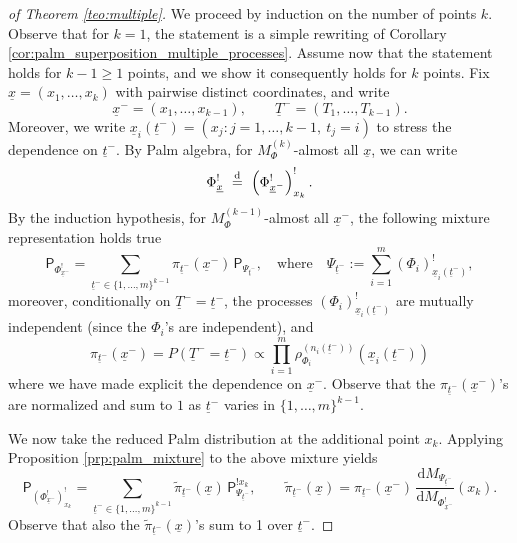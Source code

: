 \documentclass[11pt,a4paper,oneside]{article}
\newcommand{\deq}{\stackrel{\mbox{\scriptsize d}}{=}}
\newcommand{\dd}{\mathrm d}
\newcommand{\plaw}{\mathsf{P}}
\theoremstyle{definition}
\theoremstyle{remark}
\begin{document}
\begin{proof}[of Theorem \ref{teo:multiple}]
We proceed by induction on the number of points $k$. Observe that for $k=1$, the statement is a simple rewriting of Corollary \ref{cor:palm_superposition_multiple_processes}.
Assume now that the statement holds for $k-1\geq 1$ points, and we show it consequently holds for $k$ points. Fix $\underline{x}=(x_1,\ldots,x_k)$ with pairwise distinct coordinates, and write
\[
\underline{x}^-=(x_1,\ldots,x_{k-1}),\qquad \underline{T}^-=(T_1,\ldots,T_{k-1}).
\]
Moreover, we write $\underline{x}_i(\underline{t}^-) = (x_j\colon j=1, \ldots, k-1, \ t_j = i)$ to stress the dependence on $\underline{t}^-$.
By Palm algebra, for $M_\Phi^{(k)}$-almost all $\underline{x}$, we can write
\begin{equation}
\label{eq:palm-algebra-n}
\Phi^!_{\underline{x}}\ \deq\ \left(\Phi^!_{\underline{x}^-}\right)^!_{x_k}.
\end{equation}
By the induction hypothesis, for $M_\Phi^{(k-1)}$-almost all $\underline{x}^-$, the following mixture representation holds true
\[
\plaw_{\Phi^{!}_{{\underline{x}^-}}}
=\sum_{\underline{t}^-\in\{1,\ldots,m\}^{k-1}} \pi_{\underline{t}^-}(\underline{x}^-)\,\plaw_{\Psi_{\underline{t}^-}},
\quad \text{where} \quad
\Psi_{\underline{t}^-}:=\sum_{i=1}^m (\Phi_i)^!_{\underline{x}_i(\underline{t}^-)},
\]
moreover, conditionally on $\underline{T}^-=\underline{t}^-$, the processes $(\Phi_i)^!_{\underline{x}_i(\underline{t}^-)}$ are mutually independent (since the $\Phi_i$'s are independent), and
\begin{equation}
\label{eq:ind-hyp-weights}
\pi_{\underline{t}^-}(\underline{x}^-)=P(\underline{T}^-=\underline{t}^-)\propto \prod_{i=1}^m  \rho_{\Phi_i}^{(n_i(\underline{t}^-))}\left(\underline{x}_i(\underline{t}^-)\right)
\end{equation}
where we have made explicit the dependence on $\underline{x}^-$. Observe that the $\pi_{\underline{t}^-}(\underline{x}^-)$'s are normalized and sum to $1$ as $\underline{t}^-$ varies in $\{1, \ldots, m\}^{k-1}$.

We now take the reduced Palm distribution at the additional point $x_k$. Applying Proposition \ref{prp:palm_mixture} to the above mixture yields
\begin{equation}
\label{eq:mix-after-propS1}
\mathsf{P}_{\left(\Phi^!_{\underline{x}^-}\right)^!_{x_k}}
=\sum_{\underline{t}^-\in\{1,\ldots,m\}^{k-1}} \widetilde{\pi}_{\underline{t}^-}(\underline{x})\,\plaw^{!x_k}_{\Psi_{\underline{t}^-}},
\qquad
\widetilde{\pi}_{\underline{t}^-}(\underline{x})=\pi_{\underline{t}^-}(\underline{x}^-)\,\frac{\dd M_{\Psi_{\underline{t}^-}}}{\dd M_{\Phi^!_{\underline{x}^-}}}(x_k).
\end{equation}
Observe that also the $\widetilde{\pi}_{\underline{t}^-}(\underline{x})$'s sum to 1 over $\underline{t}^-$.



\end{proof}
\end{document}
